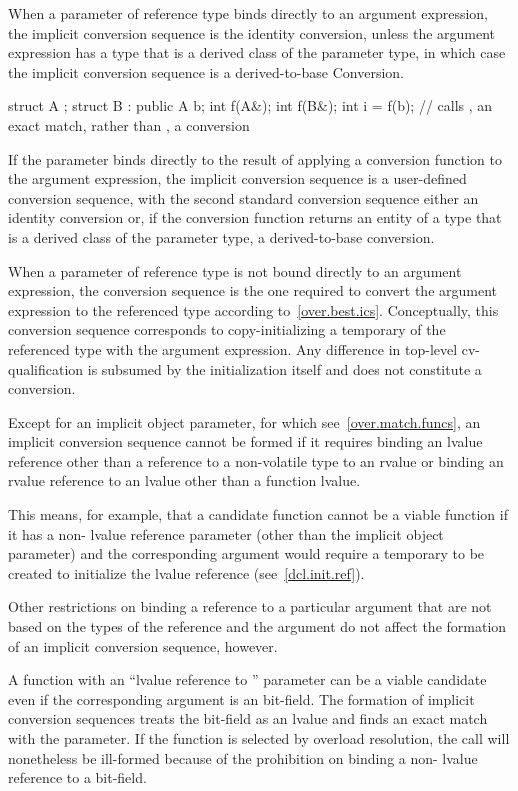 \pnum
When a parameter of reference type binds directly to an
argument expression, the implicit conversion sequence is the identity conversion,
unless the argument expression has a type that is a derived class of the parameter
type, in which case the implicit conversion sequence is a derived-to-base
Conversion.
\begin{example}
\begin{codeblock}
struct A {};
struct B : public A {} b;
int f(A&);
int f(B&);
int i = f(b);       // calls , an exact match, rather than , a conversion
\end{codeblock}
\end{example}
If the parameter binds directly to the result of
applying a conversion function to the argument expression, the implicit
conversion sequence is a user-defined conversion sequence,
with the second standard conversion sequence either an identity conversion or,
if the conversion function returns an entity of a type that is a derived class
of the parameter type, a derived-to-base conversion.

\pnum
When a parameter of reference type is not bound directly to an argument
expression, the conversion sequence is the one required to convert the argument
expression to the referenced type according to~\ref{over.best.ics}.
Conceptually, this conversion sequence corresponds to copy-initializing a
temporary of the referenced type with the argument expression.
Any difference
in top-level cv-qualification is subsumed by the initialization itself and
does not constitute a conversion.

\pnum
Except for an implicit object parameter, for which see~\ref{over.match.funcs},
an implicit conversion sequence cannot be formed if it requires
binding an lvalue reference
other than a reference to a non-volatile  type
to an rvalue
or binding an rvalue reference to an lvalue other than a function lvalue.
\begin{note}
This means, for example, that a candidate function cannot be a viable
function if it has a non- lvalue reference parameter (other than
the implicit object parameter) and the corresponding argument
would require a temporary to be created to initialize the lvalue
reference (see~\ref{dcl.init.ref}).
\end{note}

\pnum
Other restrictions on binding a reference to a particular argument
that are not based on the types of the reference and the argument
do not affect the formation of an implicit conversion
sequence, however.
\begin{example}
A function with an ``lvalue reference to '' parameter can
be a viable candidate even if the corresponding argument is an
bit-field.
The formation of implicit conversion sequences
treats the
bit-field as an
lvalue and finds an exact
match with the parameter.
If the function is selected by overload
resolution, the call will nonetheless be ill-formed because of
the prohibition on binding a non- lvalue reference to a bit-field.
\end{example}

